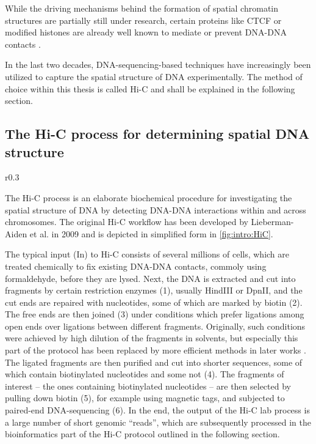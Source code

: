 While the driving mechanisms behind the formation of spatial chromatin structures are partially still under research,
certain proteins like CTCF or modified histones are already well known to mediate or prevent DNA-DNA contacts \cite{Phillips2009,PhillipsCremins2013,Dixon2015}.

In the last two decades, DNA-sequencing-based techniques have increasingly been utilized to capture the spatial structure of DNA experimentally.
The method of choice within this thesis is called Hi-C and shall be explained in the following section.

\subsection{The Hi-C process for determining spatial DNA structure} \label{sec:intro:hic}
\begin{wrapfigure}[27]{r}{0.3\textwidth}
 \vspace{-19mm}
 \caption{Hi-C lab process}
 \label{fig:intro:HiC}
\end{wrapfigure}
The Hi-C process is an elaborate biochemical procedure for investigating the 
spatial structure of DNA by detecting DNA-DNA interactions within and 
across chromosomes.
The original Hi-C workflow has been developed by Lieberman-Aiden et al. in 2009  \cite{LiebermanAiden2009}
and is depicted in simplified form in \cref{fig:intro:HiC}.

The typical input (In) to Hi-C consists of several millions of cells,
which are treated chemically to fix existing DNA-DNA contacts, 
commoly using formaldehyde, before they are lysed.
Next, the DNA is extracted and cut into fragments by certain restriction enzymes (1),
usually HindIII or DpnII, 
and the cut ends are repaired with nucleotides, some of which are marked by biotin (2).
The free ends are then joined (3) under conditions which prefer
ligations among open ends over ligations between different fragments.
Originally, such conditions were achieved by high dilution of the fragments in
solvents, but especially this part of the protocol has been replaced by 
more efficient methods in later works \cite{Rao2014,Belaghzal2017}.
The ligated fragments are then purified and cut into shorter sequences,
some of which contain biotinylated nucleotides and some not (4).
The fragments of interest -- the ones containing biotinylated nucleotides -- 
are then selected by pulling down biotin (5), for example using magnetic tags,  
and subjected to paired-end DNA-sequencing (6).
In the end, the output of the Hi-C lab process is a large number of short genomic ``reads'',
which are subsequently processed in the bioinformatics part of the Hi-C protocol 
outlined in the following section.

